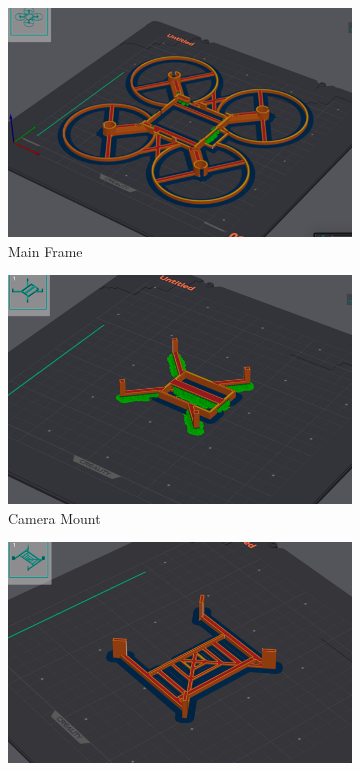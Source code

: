 \begin{manualblock}
\begin{figure}[H]
  \centering
  \begin{subfigure}[b]{0.48\linewidth}
    \centering
    \includegraphics[width=\linewidth]{img/manual/3dp1.png}
    \caption{Main Frame}
  \end{subfigure}
  \hfill
  \begin{subfigure}[b]{0.48\linewidth}
    \centering
    \includegraphics[width=\linewidth]{img/manual/3dp2.png}
    \caption{Camera Mount}
  \end{subfigure}
  \begin{subfigure}[b]{0.48\linewidth}
    \centering
    \includegraphics[width=\linewidth]{img/manual/3dp3.png}

\end{subfigure}
\end{figure}
\end{manualblock}
